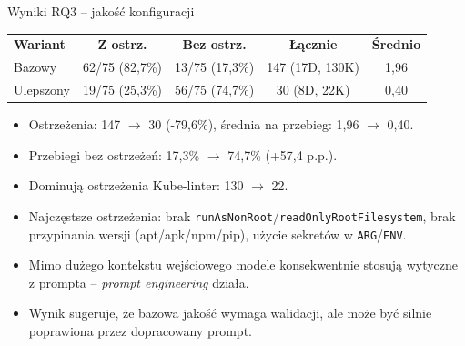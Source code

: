 \documentclass[aspectratio=169]{beamer}
\begin{document}
\begin{frame}{Wyniki RQ3 -- jakość konfiguracji}
    \small
    \begin{center}
        \begin{tabular}{lcccc}
            \textbf{Wariant} & \textbf{Z ostrz.} & \textbf{Bez ostrz.} & \textbf{Łącznie} & \textbf{Średnio} \\
            Bazowy & 62/75 (82,7\%) & 13/75 (17,3\%) & 147 (17D, 130K) & 1,96 \\
            Ulepszony & 19/75 (25,3\%) & 56/75 (74,7\%) & 30 (8D, 22K) & 0,40 \\
        \end{tabular}
    \end{center}
    \begin{itemize}
        \item Ostrzeżenia: 147 $\rightarrow$ 30 (-79,6\%), średnia na przebieg: 1,96 $\rightarrow$ 0,40.
        \item Przebiegi bez ostrzeżeń: 17,3\% $\rightarrow$ 74,7\% (+57,4 p.p.).
        \item Dominują ostrzeżenia Kube-linter: 130 $\rightarrow$ 22.
        \item Najczęstsze ostrzeżenia: brak \texttt{runAsNonRoot}/\texttt{readOnlyRootFilesystem}, brak przypinania wersji (apt/apk/npm/pip), użycie sekretów w \texttt{ARG}/\texttt{ENV}.
        \item Mimo dużego kontekstu wejściowego modele konsekwentnie stosują wytyczne z prompta -- \textit{prompt engineering} działa.
        \item Wynik sugeruje, że bazowa jakość wymaga walidacji, ale może być silnie poprawiona przez dopracowany prompt.
    \end{itemize}
\end{frame}
\end{document}
